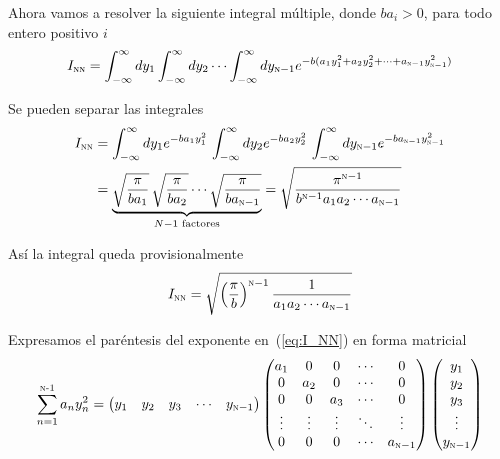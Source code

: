Ahora vamos a resolver la siguiente integral múltiple, donde
$ba_i > 0$, para todo entero positivo $i$
\begin{equation}\label{eq:I_NN}
  I_{\textsc{n}\textsc{n}}
  =
  \int_{-\infty}^{\infty} dy_1
  \int_{-\infty}^{\infty} dy_2
  \cdots
  \int_{-\infty}^{\infty} dy_{\textsc{n}-1}
  e^{-b(a_1y_1^2 + a_2y_2^2 + \cdots + a_{\textsc{n}-1}y_{\textsc{n}-1}^2)}
\end{equation}

Se pueden separar las integrales
\begin{align*}
  I_{\textsc{n}\textsc{n}}
  &=
  \int_{-\infty}^{\infty} dy_1
    e^{-b a_1 y_1^2}
    \,
  \int_{-\infty}^{\infty} dy_2
    e^{-b a_2 y_2^2}
    \,
  \int_{-\infty}^{\infty} dy_{\textsc{n}-1}
    e^{-b a_{\textsc{n}-1} y_{\textsc{n}-1}^2}\\
  &=
    \underbrace{
    \sqrt{\dfrac{\pi}{b a_1}}
    \,
    \sqrt{\dfrac{\pi}{b a_2}}
    \cdots
    \sqrt{\dfrac{\pi}{b a_{\textsc{n}-1}}}
    }_{N-1\text{ factores}}
    =
    \sqrt{\dfrac{\pi^{\textsc{n}-1}}{b^{\textsc{n}-1} a_1a_2\cdots a_{\textsc{n}-1}}}
  \end{align*}

  Así la integral queda provisionalmente
\begin{equation}\label{eq:I_NN_temp1}
  I_{\textsc{nn}}
  =
  \sqrt{\left(\dfrac{\pi}{b}\right)^{\textsc{n}-1}\dfrac{1}{a_1a_2\cdots a_{\textsc{n}-1}}}  
\end{equation}

Expresamos el paréntesis del exponente en~(\ref{eq:I_NN}) en forma
matricial
\[
  \sum_{n=1}^{\textsc{n-1}} a_ny_n^2
  =
  \begin{pmatrix}y_1 & y_2 & y_3 & \cdots & y_{\textsc{n}-1} \end{pmatrix}
  \begin{pmatrix}
    a_1 & 0 & 0 & \cdots & 0\\
    0 & a_2 & 0 & \cdots & 0\\
    0 & 0 & a_3 & \cdots & 0\\
    \vdots & \vdots & \vdots & \ddots & \vdots \\
    0 & 0 & 0 & \cdots & a_{\textsc{n}-1}
  \end{pmatrix}
  \begin{pmatrix}y_1 \\ y_2 \\ y_3 \\ \vdots \\ y_{\textsc{n}-1} \end{pmatrix}
\]


